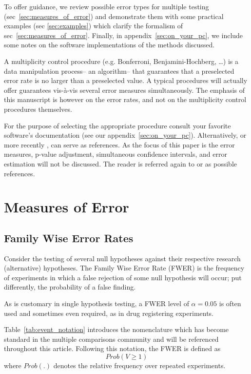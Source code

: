 \documentclass[review,12pt]{article}
\theoremstyle{definition}
\theoremstyle{definition}
\begin{document}
To offer guidance, we review possible error types for multiple testing (sec~\ref{sec:measures_of_error}) and demonstrate them with some practical examples (sec \ref{sec:examples}) which clarify the formalism of sec~\ref{sec:measures_of_error}. Finally, in appendix~\ref{sec:on_your_pc}, we include some notes on the software implementations of the methods discussed.

A multiplicity control procedure (e.g. Bonferroni, Benjamini-Hochberg, \dots) is a data manipulation process-- an algorithm-- that guarantees that a preselected error rate is no larger than a preselected value. A typical procedures will actually offer guarantees vis-\`a-vis several error measures simultaneously. 
The emphasis of this manuscript is however on the error rates, and not on the multiplicity control procedures themselves. 


For the purpose of selecting the appropriate procedure consult your favorite software's documentation (see our appendix~\ref{sec:on_your_pc}). Alternatively, \citet{farcomeni_review_2008} or more recently \citet{goeman_tutorial_2013}, can serve as  references. 
As the focus of this paper is the error measures, p-value adjustment, simultaneous confidence intervals, and error estimation will not be discussed. The reader is referred again to \cite{farcomeni_review_2008} or \cite{goeman_tutorial_2013} as possible references.


\section{\label{sec:measures_of_error}Measures of Error}

\subsection{Family Wise Error Rates}
Consider the testing of several null hypotheses against their respective research (alternative) hypotheses. The Family Wise Error Rate (FWER) is the frequency of experiments in which a false rejection of some null hypothesis will occur; put differently, the probability of a false finding.

As is customary in single hypothesis testing, a FWER level of $\alpha=0.05$ is often used and sometimes even required, as in drug registering experiments.




Table~\ref{tab:event_notation} introduces the nomenclature which has become standard in the multiple comparisons community and will be referenced throughout this article. Following this notation, the FWER is defined as 
$$Prob(V \geq 1 )$$ where $Prob(.)$ denotes the relative frequency over repeated experiments.
\end{document}
